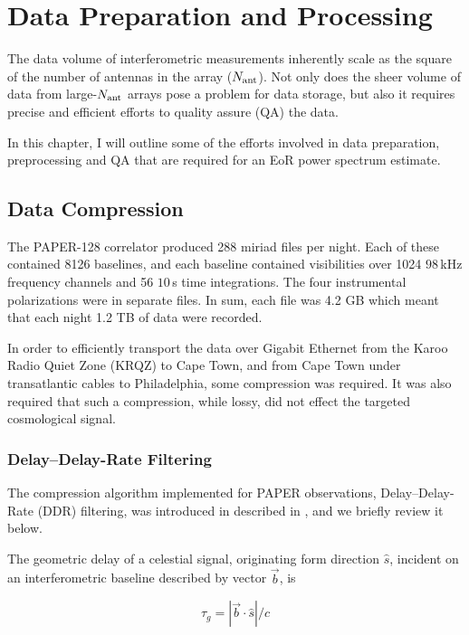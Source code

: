 \chapter{Data Preparation and Processing}
\label{chapter:data_prep_and_proc}
The data volume of interferometric measurements inherently scale as the square of the number of antennas in the array ($N_{\rm ant}$). Not only does the sheer volume of data from large-$N_{\rm ant}$ arrays pose a problem for data storage, but also it requires precise and efficient efforts to quality assure (QA) the data. 

In this chapter, I will outline some of the efforts involved in data preparation, preprocessing and QA that are required for an EoR power spectrum estimate.

\section{Data Compression}
\label{sec:data_compression}

The PAPER-128 correlator produced 288 {\sc miriad} files per night. Each of these contained 8126 baselines, and each baseline contained visibilities over 1024 $98$\,kHz frequency channels and 56 $10$\,s time integrations. The four instrumental polarizations were in separate files. In sum, each file was 4.2 GB which meant that each night 1.2 TB of data were recorded.

In order to efficiently transport the data over Gigabit Ethernet from the Karoo Radio Quiet Zone (KRQZ) to Cape Town, and from Cape Town under transatlantic cables to Philadelphia, some compression was required. It was also required that such a compression, while lossy, did not effect the targeted cosmological signal.

\subsection{Delay--Delay-Rate Filtering}

The compression algorithm implemented for PAPER observations, Delay--Delay-Rate (DDR) filtering, was introduced in \cite{ParsonsBacker.09} described in \cite{Parsons.14}, and we briefly review it below.

The geometric delay of a celestial signal, originating form direction $\hat{s}$, incident on an interferometric baseline described by vector $\vec{b}$, is

\begin{equation}
\tau_g = |\vec{b} \cdot \hat{s}|/c
\end{equation}

